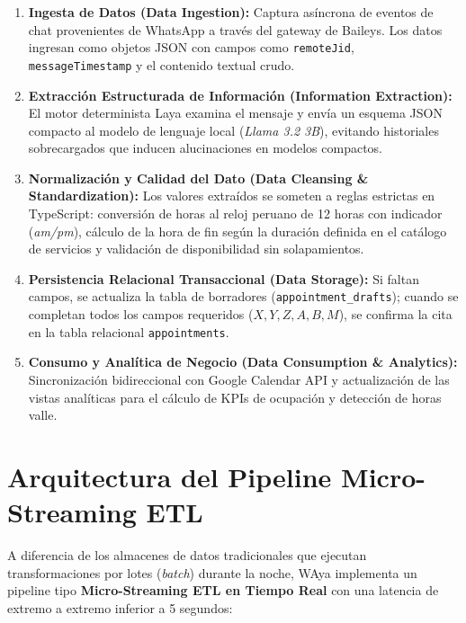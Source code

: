 \documentclass[12pt,a4paper]{report}
\begin{document}
\begin{enumerate}[leftmargin=1.5em]
    \item \textbf{Ingesta de Datos (Data Ingestion):} Captura asíncrona de eventos de chat provenientes de WhatsApp a través del gateway de Baileys. Los datos ingresan como objetos JSON con campos como \texttt{remoteJid}, \texttt{messageTimestamp} y el contenido textual crudo.
    \item \textbf{Extracción Estructurada de Información (Information Extraction):} El motor determinista Laya examina el mensaje y envía un esquema JSON compacto al modelo de lenguaje local (\textit{Llama 3.2 3B}), evitando historiales sobrecargados que inducen alucinaciones en modelos compactos.
    \item \textbf{Normalización y Calidad del Dato (Data Cleansing \& Standardization):} Los valores extraídos se someten a reglas estrictas en TypeScript: conversión de horas al reloj peruano de 12 horas con indicador (\textit{am/pm}), cálculo de la hora de fin según la duración definida en el catálogo de servicios y validación de disponibilidad sin solapamientos.
    \item \textbf{Persistencia Relacional Transaccional (Data Storage):} Si faltan campos, se actualiza la tabla de borradores (\texttt{appointment\_drafts}); cuando se completan todos los campos requeridos ($X, Y, Z, A, B, M$), se confirma la cita en la tabla relacional \texttt{appointments}.
    \item \textbf{Consumo y Analítica de Negocio (Data Consumption \& Analytics):} Sincronización bidireccional con Google Calendar API y actualización de las vistas analíticas para el cálculo de KPIs de ocupación y detección de horas valle.
\end{enumerate}

\section{Arquitectura del Pipeline Micro-Streaming ETL}
A diferencia de los almacenes de datos tradicionales que ejecutan transformaciones por lotes (\textit{batch}) durante la noche, WAya implementa un pipeline tipo \textbf{Micro-Streaming ETL en Tiempo Real} con una latencia de extremo a extremo inferior a 5 segundos:
\end{document}
